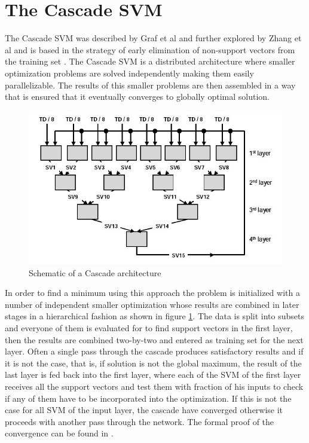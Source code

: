 \section{The Cascade SVM}

The Cascade SVM was described by Graf et al \cite{GrafCBDV04} and
further explored by Zhang et al \cite{ZhangZY05} and is based in
the strategy of early elimination of non-support vectors from the
training set \cite{Joachims/99a}. The Cascade SVM is a distributed
architecture where smaller optimization problems are solved independently
making them easily parallelizable. The results of this smaller problems
are then assembled in a way that is ensured that it eventually converges
to globally optimal solution.

%
\begin{figure}[H]
\begin{centering}
\includegraphics[scale=0.5]{images/graf-svm-cascade}
\par\end{centering}

\caption{Schematic of a Cascade architecture \cite{GrafCBDV04}}
\label{fig:svm-cascade}
\end{figure}


In order to find a minimum using this approach the problem is initialized
with a number of independent smaller optimization whose results are
combined in later stages in a hierarchical fashion as shown in figure
\ref{fig:svm-cascade}. The data is split into subsets and everyone
of them is evaluated for to find support vectors in the first layer,
then the results are combined two-by-two and entered as training set
for the next layer. Often a single pass through the cascade produces
satisfactory results and if it is not the case, that is, if solution
is not the global maximum, the result of the last layer is fed back
into the first layer, where each of the SVM of the first layer receives
all the support vectors and test them with fraction of his inputs
to check if any of them have to be incorporated into the optimization.
If this is not the case for all SVM of the input layer, the cascade
have converged otherwise it proceeds with another pass through the
network. The formal proof of the convergence can be found in \cite{GrafCBDV04}.


